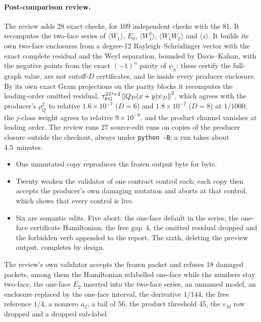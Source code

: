 \paragraph{Post-comparison review.}
The review adds 28 exact checks, for 109 independent checks with the 81. It
recomputes the two-face series of $\langle W_1\rangle$, $E_0$,
$\langle W_1^2\rangle$, $\langle W_1W_2\rangle$ and $\langle z\rangle$. It
builds its own two-face enclosures from a degree-12 Rayleigh--Schr\"odinger
vector with the exact complete residual and the Weyl separation, bounded by
Davis--Kahan, with the negative points from the exact $(-1)^n$ parity of
$\psi_n$; these certify the full-graph value, are not cutoff-$D$
certificates, and lie inside every producer enclosure. By its own exact Gram
projections on the parity blocks it recomputes the leading-order omitted
residual, $\tau_{\mathrm{FG}}^{2D+2}\left\lVert Q_D(x+y)\psi_D\right\rVert^2$, which agrees with the
producer's $\rho_Q^2$ to relative $1.6\times10^{-7}$ ($D=6$) and
$1.8\times10^{-7}$ ($D=8$) at $1/1000$; the $j$-class weight agrees to
relative $9\times10^{-8}$, and the product channel vanishes at leading order.
The review runs 27 source-edit runs on copies of the producer closure outside
the checkout, always under \texttt{python -B}; a run takes about
4.5~minutes.
\begin{itemize}
\item One unmutated copy reproduces the frozen output byte for byte.
\item Twenty weaken the validator of one contract control each; each copy
 then accepts the producer's own damaging mutation and aborts at that
 control, which shows that every control is live.
\item Six are semantic edits. Five abort: the one-face default in the series,
 the one-face certificate Hamiltonian, the free gap~4, the omitted residual
 dropped and the forbidden verb appended to the report. The sixth, deleting
 the preview output, completes by design.
\end{itemize}
The review's own validator accepts the frozen packet and refuses 18 damaged
packets, among them the Hamiltonian relabelled one-face while the numbers stay
two-face, the one-face $E_2$ inserted into the two-face series, an unnamed
model, an enclosure replaced by the one-face interval, the derivative
$1/144$, the free reference $1/4$, a nonzero $a_2$, a tail of 56, the product
threshold 45, the $v_M$ row dropped and a dropped sub-label.

